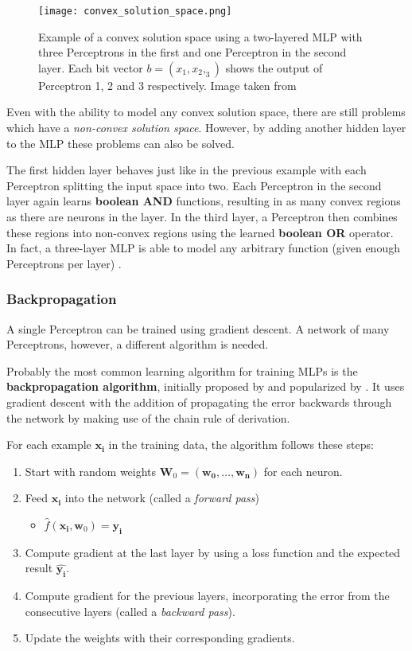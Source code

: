\begin{figure}[htb!]
    \centering
    \texttt{[image: convex\_solution\_space.png]}
    \caption{Example of a convex solution space using a two-layered MLP with three Perceptrons in the first and one Perceptron in the second layer. Each bit vector $b = (x_1, x_2, _3)$ shows the output of Perceptron 1, 2 and 3 respectively. Image taken from \cite{rojas_neural_1996}}
    \label{fig:convex-solution}
\end{figure}

Even with the ability to model any convex solution space, there are still problems which have a \textit{non-convex solution space}.
However, by adding another hidden layer to the MLP these problems can also be solved.

The first hidden layer behaves just like in the previous example with each Perceptron splitting the input space into two.
Each Perceptron in the second layer again learns \textbf{boolean AND} functions, resulting in as many convex regions as there are neurons in the layer.
In the third layer, a Perceptron then combines these regions into non-convex regions using the learned \textbf{boolean OR} operator.
In fact, a three-layer MLP is able to model any arbitrary function (given enough Perceptrons per layer) \cite{rojas_neural_1996}.

\subsubsection{Backpropagation}
A single Perceptron can be trained using gradient descent.
A network of many Perceptrons, however, a different algorithm is needed.

Probably the most common learning algorithm for training MLPs is the \textbf{backpropagation algorithm}, initially proposed by \cite{werbos_beyond_1974} and popularized by \cite{rumelhart_learning_1986}.
It uses gradient descent with the addition of propagating the error backwards through the network by making use of the chain rule of derivation.

For each example $\bm{x_i}$ in the training data, the algorithm follows these steps:

\begin{enumerate}
    \item Start with random weights $\bm{W}_0 = (\bm{w_0}, \dots, \bm{w_n})$ for each neuron.
    \item Feed $\bm{x_i}$ into the network (called a \textit{forward pass})
    \begin{itemize}
        \item $\hat{f}(\bm{x_i}, \bm{w}_0) = \bm{y_i}$
    \end{itemize}
    \item Compute gradient at the last layer by using a loss function and the expected result $\hat{\bm{y_i}}$.
    \item Compute gradient for the previous layers, incorporating the error from the consecutive layers (called a \textit{backward pass}).
    \item Update the weights with their corresponding gradients.
\end{enumerate}

